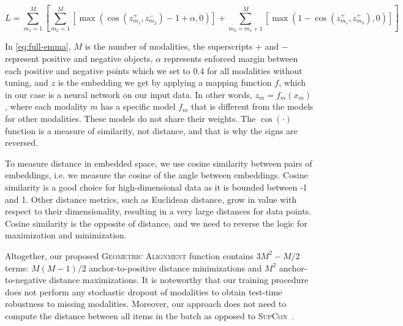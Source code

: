 \documentclass[10pt]{article} %
\newcommand{\geom}{\textsc{Geometric Alignment}}
\newcommand{\supcon}{\textsc{SupCon}}
\begin{document}
\begin{equation}\label{eq:full-emma}
    L = \sum_{m_1=1}^{M} \left[ \sum_{m_2=1}^{M} \left[ \max (\cos(z_{m_1}^{+}, z_{m_2}^{-}) -1 + \alpha,0) \right] + \sum_{m_3=m_1+1}^{M} \left[ \max(1 - \cos(z_{m_1}^{+},z_{m_3}^{+}),0) \right] \right]
\end{equation}

In \cref{eq:full-emma}, $M$ is the number of modalities, the superscripts $+$ and $-$ represent positive and negative objects, $\alpha$ represents enforced margin between each positive and negative points which we set to 0.4 for all modalities without tuning, and $z$ is the embedding we get by applying a mapping function $f$, which in our case is a neural network on our input data.
In other words, $z_m = f_m(x_m)$, where each modality $m$ has a specific model $f_m$ that is different from the models for other modalities. These models do not share their weights. The $\cos(\cdot)$ function is a measure of similarity, not distance, and that is why the signs are reversed. 

To measure distance in embedded space, we use cosine similarity between pairs of embeddings, i.e. we measure the cosine of the angle between embeddings. Cosine similarity is a good choice for high-dimensional data as it is bounded between -1 and 1. Other distance metrics, such as Euclidean distance, grow in value with respect to their dimensionality, resulting in a very large distances for data points. Cosine similarity is the opposite of distance, and we need to reverse the logic for maximization and minimization.

Altogether, our proposed \geom{} function contains 
$3M^2-M/2$ terms: 
$M(M-1)/2$ anchor-to-positive distance minimizations and $M^2$ anchor-to-negative distance maximizations.
It is noteworthy that our training procedure does not perform any stochastic dropout of modalities to obtain test-time robustness to missing modalities. Moreover, our approach does not need to compute the distance between all items in the batch as opposed to \supcon{}~\cite{NEURIPS2020_supervised_contrastive}.
\end{document}
